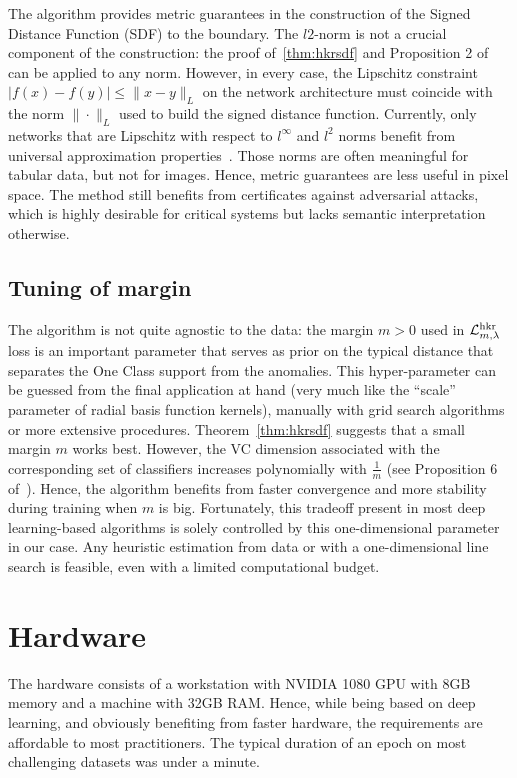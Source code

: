 The algorithm provides metric guarantees in the construction of the Signed Distance Function (SDF) to the boundary. The $l2$-norm is not a crucial component of the construction: the proof of~\ref{thm:hkrsdf} and Proposition 2 of~\cite{serrurier2021achieving} can be applied to any norm. However, in every case, the Lipschitz constraint $|f(x)-f(y)|\leq \|x-y\|_L$ on the network architecture must coincide with the norm $\|\cdot\|_L$ used to build the signed distance function. Currently, only networks that are Lipschitz with respect to $l^{\infty}$ and $l^2$ norms benefit from universal approximation properties~\cite{anil2019sorting}. Those norms are often meaningful for tabular data, but not for images. Hence, metric guarantees are less useful in pixel space. The method still benefits from certificates against adversarial attacks, which is highly desirable for critical systems but lacks semantic interpretation otherwise.  

\subsection{Tuning of margin}

The algorithm is not quite agnostic to the data: the margin $m>0$ used in $\mathcal{L}^{\text{hkr}}_{m,\lambda}$ loss is an important parameter that serves as prior on the typical distance that separates the One Class support from the anomalies. This hyper-parameter can be guessed from the final application at hand (very much like the ``scale'' parameter of radial basis function kernels), manually with grid search algorithms or more extensive procedures. Theorem~\ref{thm:hkrsdf} suggests that a small margin $m$ works best. However, the VC dimension associated with the corresponding set of classifiers increases polynomially with $\frac{1}{m}$ (see Proposition 6 of~\cite{bethune2022pay}). Hence, the algorithm benefits from faster convergence and more stability during training when $m$ is big. Fortunately, this tradeoff present in most deep learning-based algorithms is solely controlled by this one-dimensional parameter in our case. Any heuristic estimation from data or with a one-dimensional line search is feasible, even with a limited computational budget.  

\section{Hardware}\label{app:hardware}

The hardware consists of a workstation with NVIDIA 1080 GPU with 8GB memory and a machine with 32GB RAM. Hence, while being based on deep learning, and obviously benefiting from faster hardware, the requirements are affordable to most practitioners. The typical duration of an epoch on most challenging datasets was under a minute.    
